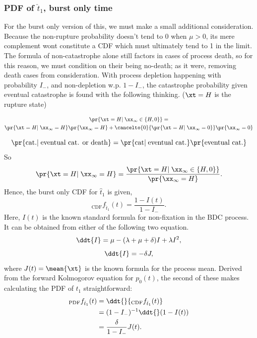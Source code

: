 \subsubsection*{PDF of $\hat t_1$, burst only time}
For the burst only version of this, we must make a small additional consideration. Because the non-rupture probability doesn't tend to 0 when $\mu >0$, its mere complement wont constitute a CDF which must ultimately tend to 1 in the limit. The formula of non-catastrophe alone still factors in cases of process death, so for this reason, we must condition on their being no-death; as it were, removing death cases from consideration. With process depletion happening with probability $I_-$, and non-depletion w.p. $1-I_-$, the catastrophe probability given eventual catastrophe is found with the following thinking. ($\xt = H$ is the rupture state)



\begin{multline*}
\pr{\xt = H | \;\xx_{\infty} \in \{ H, 0\}} =\\ \pr{\xt=H| \;\xx_{\infty} = H}\pr{\xx_{\infty} = H} + \cancelto{0}{\pr{\xt = H| \;\xx_{\infty} = 0}}\pr{\xx_{\infty} = 0}
\end{multline*}


$$\pr{\text{cat.}|\; \text{eventual cat. or death}} = \pr{\text{cat}|\;\text{eventual cat.}}\pr{\text{eventual cat.}}$$
So 
$$\pr{\xt=H| \;\xx_{\infty} = H} = \frac{\pr{\xt = H | \;\xx_{\infty} \in \{ H, 0\}} }{\pr{\xx_{\infty} = H} }.$$
Hence, the burst only CDF for $\hat t_1$ is given,
$$_{\text{CDF}}f_{\hat t_1}(t) = \frac{1-I(t)}{1-I_-}.$$
Here, $I(t)$ is the known standard formula for non-fixation in the BDC process. It can be obtained from either of the following two equation. 
$$\ddt{I} = \mu - (\lambda+\mu+\delta) I + \lambda I^2,$$
$$\ddt{I} = - \delta J,$$
where $J(t) = \mean{\xt}$ is the known formula for the process mean. Derived from the forward Kolmogorov equation for $p_0(t)$, the second of these makes calculating the PDF of $t_1$ straightforward: 
\begin{align*}
_{\text{PDF}}f_{\hat t_1}(t) &= \ddt{}{ _{\text{CDF}}f_{\hat t_1}(t)}\\
&= (1-I_-)^{-1} \ddt{} (1-I(t))\\
&= \frac{\delta} {1-I_-}J(t).
\end{align*}

